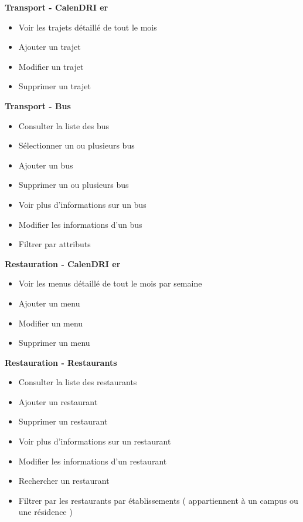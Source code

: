     \textbf{Transport - Calen\acs{DRI} er}
    \begin{itemize}
        \item Voir les trajets détaillé de tout le mois
        \item Ajouter un trajet
        \item Modifier un trajet
        \item Supprimer un trajet \\
    \end{itemize}

    \textbf{Transport - Bus}
    \begin{itemize}
        \item Consulter la liste des bus
        \item Sélectionner un ou plusieurs bus
        \item Ajouter un bus
        \item Supprimer un ou plusieurs bus
        \item Voir plus d'informations sur un bus
        \item Modifier les informations d'un bus
        \item Filtrer par attributs \\
    \end{itemize}

    \textbf{Restauration - Calen\acs{DRI} er}
    \begin{itemize}
        \item Voir les menus détaillé de tout le mois par semaine
        \item Ajouter un menu
        \item Modifier un menu
        \item Supprimer un menu \\
    \end{itemize}

    \textbf{Restauration - Restaurants}
    \begin{itemize}
        \item Consulter la liste des restaurants
        \item Ajouter un restaurant
        \item Supprimer un restaurant
        \item Voir plus d'informations sur un restaurant
        \item Modifier les informations d'un restaurant
        \item Rechercher un restaurant
        \item Filtrer par les restaurants par établissements ( appartiennent à un campus ou une résidence )\\
    \end{itemize}

